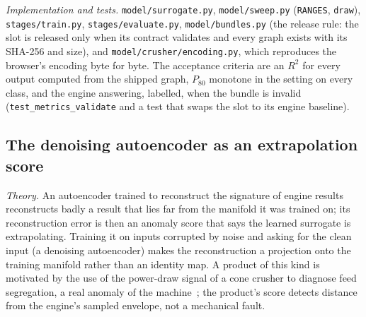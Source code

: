 \emph{Implementation and tests.} \texttt{model/\allowbreak{}surrogate.py}, \texttt{model/\allowbreak{}sweep.py} (\texttt{RANGES}, \texttt{draw}), \texttt{stages/\allowbreak{}train.py},
\texttt{stages/\allowbreak{}evaluate.py}, \texttt{model/\allowbreak{}bundles.py} (the release rule: the slot is released only when its contract validates and every graph
exists with its SHA-256 and size), and \texttt{model/\allowbreak{}crusher/\allowbreak{}encoding.py}, which reproduces the browser's encoding byte for byte. The acceptance
criteria are an $R^2$ for every output computed from the shipped graph, $P_{80}$ monotone in the setting on every class, and the engine answering,
labelled, when the bundle is invalid (\texttt{test\_metrics\_validate} and a test that swaps the slot to its engine baseline).

\subsection{The denoising autoencoder as an extrapolation score}\label{sec:m-ae}

\emph{Theory.} An autoencoder trained to reconstruct the signature of engine results reconstructs badly a result that lies far from the manifold
it was trained on; its reconstruction error is then an anomaly score that says the learned surrogate is extrapolating. Training it on inputs
corrupted by noise and asking for the clean input (a denoising autoencoder) makes the reconstruction a projection onto the training manifold rather
than an identity map. A product of this kind is motivated by the use of the power-draw signal of a cone crusher to diagnose feed segregation, a
real anomaly of the machine~\cite{grondahl2018}; the product's score detects distance from the engine's sampled envelope, not a mechanical fault.

